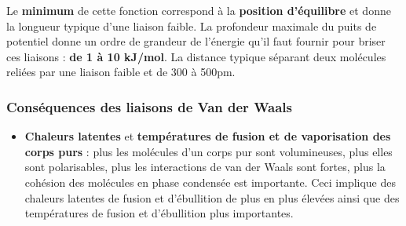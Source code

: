 \documentclass[11pt,a4paper]{report}
\begin{document}
Le \textbf{minimum} de cette fonction correspond à la \textbf{position d'équilibre} et donne la longueur typique d'une liaison faible. La profondeur maximale du puits de potentiel donne un ordre de grandeur de l'énergie qu'il faut fournir pour briser ces liaisons : \textbf{de 1 à 10 kJ/mol}. La distance typique séparant deux molécules reliées par une liaison faible et de 300 à 500pm.

\subsubsection{Conséquences des liaisons de Van der Waals}

\begin{itemize}
\item \textbf{Chaleurs latentes} et \textbf{températures de fusion et de vaporisation des corps purs} : plus les molécules d'un corps pur sont volumineuses, plus elles sont polarisables, plus les interactions de van der Waals sont fortes, plus la cohésion des molécules en phase condensée est importante. Ceci implique des chaleurs latentes de fusion et d'ébullition de plus en plus élevées ainsi que des températures de fusion et d'ébullition plus importantes.\\
	

\end{itemize}
\end{document}
